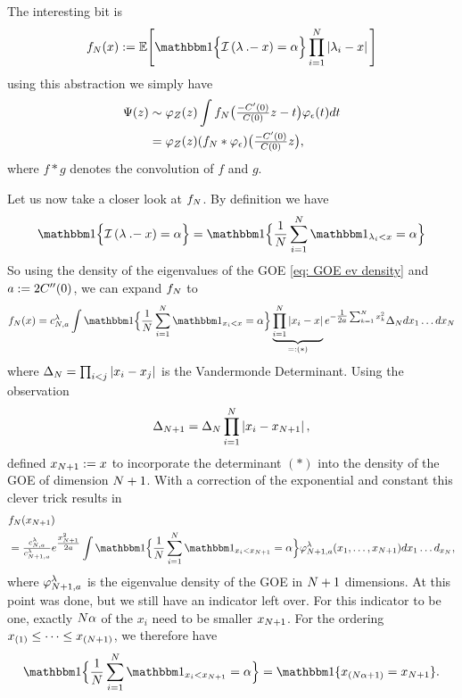 The interesting bit is
\[
	f_\dims(x):=\E\Bigg[
		\ind\Bigl\{
			\negEV\left(\evGOE \dotMinus x\right) = \alpha
		\Bigr\}
		\prod_{i=1}^\dims \left|
			\evGOE_i - x
		\right|
	\Bigg]
\]
using this abstraction we simply have
\[\begin{aligned}
	\Psi(z)
	&\sim \varphi_Z(z)
	\int f_N\bigl(\tfrac{-C'(0)}{C(0)}z - t\bigr)
	\varphi_\epsilon(t)dt\\
	&= \varphi_Z(z)
	(f_N * \varphi_\epsilon)\bigl(\tfrac{-C'(0)}{C(0)}z\bigr),
\end{aligned}\]
where \(f*g\) denotes the convolution of \(f\) and \(g\).

Let us now take a closer look at \(f_N\). 
By definition we have
\[
		\ind\Bigl\{
			\negEV\left(\evGOE \dotMinus x\right) = \alpha
		\Bigr\}
		= \ind\Bigl\{
			\frac1\dims\sum_{i=1}^\dims \ind_{\evGOE_i < x} = \alpha
		\Bigr\}
\]
So using the density of the
eigenvalues of the GOE \eqref{eq: GOE ev density} and \(a:=2C''(0)\),
we can expand \(f_N\) to
\[
	f_\dims(x)
	= c^\evGOE_{\dims,a}\int
	\ind\Bigl\{
			\frac1\dims\sum_{i=1}^\dims \ind_{x_i < x} = \alpha
	\Bigr\}
	\underbrace{
	\prod_{i=1}^\dims \left|
		x_i - x
	\right|
	}_{=:(*)}
	e^{-\tfrac1{2a}\sum_{k=1}^\dims x_k^2} \Delta_N dx_1\dots dx_\dims
\]
where \(\Delta_N = \prod_{i<j}|x_i-x_j|\) is the Vandermonde
Determinant. Using the observation
\[
	\Delta_{N+1} = 
	\Delta_N\prod_{i=1}^N \left|
		x_i - x_{N+1}
	\right|,
\]
\textcite{fyodorovComplexityRandomEnergy2004} defined \(x_{N+1}:=x\) to
incorporate the determinant \((*)\) into the density of the GOE of dimension
\(N+1\). With a correction of the exponential and constant this
clever trick results in
\[\begin{aligned}
	&f_\dims(x_{\dims+1})\\
	&= \tfrac{c^\evGOE_{\dims, a}}{c^\evGOE_{\dims+1,a}}
	e^{\tfrac{x_{\dims+1}^2}{2a}}
	\int \ind\Bigl\{
			\frac1\dims\sum_{i=1}^\dims \ind_{x_i < x_{\dims+1}} = \alpha
	\Bigr\}
	\varphi^\evGOE_{\dims+1,a}(x_1,\dots,x_{\dims+1})
	dx_1\dots d_{x_\dims},
\end{aligned}\]
where \(\varphi^\lambda_{N+1,a}\) is the eigenvalue density of the GOE
in \(N+1\) dimensions. At this point
\textcite{fyodorovComplexityRandomEnergy2004} was done, but we still have an
indicator left over. For this indicator to be one, exactly \(N\alpha\)
of the \(x_i\) need to be smaller \(x_{N+1}\). For the ordering
\(x_{(1)}\le\dots\le x_{(N+1)}\), we therefore have
\[
	\ind\Bigl\{
			\frac1\dims\sum_{i=1}^\dims \ind_{x_i < x_{\dims+1}} = \alpha
	\Bigr\}
	= \ind\{x_{(\dims\alpha+1)} = x_{\dims+1}\}.
\]
